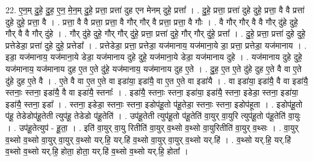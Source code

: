\documentclass[17pt]{extarticle}
\begin{document}
22. ए॒न॒म् दु॒हे॒ दु॒ह॒ ए॒न॒ मे॒न॒म् दु॒हे॒ प्रत्ता॒ प्रत्ता॑ दुह एन मेनम् दुहे॒ प्रत्ता᳚ । . दु॒हे॒ प्रत्ता॒ प्रत्ता॑ दुहे दुहे॒ प्रत्ता॒ वै वै प्रत्ता॑ दुहे दुहे॒ प्रत्ता॒ वै । . प्रत्ता॒ वै वै प्रत्ता॒ प्रत्ता॒ वै गौर् गौर् वै प्रत्ता॒ प्रत्ता॒ वै गौः । . वै गौर् गौर् वै वै गौर् दु॑हे दुहे॒ गौर् वै वै गौर् दु॑हे । . गौर् दु॑हे दुहे॒ गौर् गौर् दु॑हे॒ प्रत्ता॒ प्रत्ता॑ दुहे॒ गौर् गौर् दु॑हे॒ प्रत्ता᳚ । . दु॒हे॒ प्रत्ता॒ प्रत्ता॑ दुहे दुहे॒ प्रत्तेडेडा॒ प्रत्ता॑ दुहे दुहे॒ प्रत्तेडा᳚ । . प्रत्तेडेडा॒ प्रत्ता॒ प्रत्तेडा॒ यज॑मानाय॒ यज॑माना॒ये डा॒ प्रत्ता॒ प्रत्तेडा॒ यज॑मानाय । . इडा॒ यज॑मानाय॒ यज॑माना॒ये डेडा॒ यज॑मानाय दुहे दुहे॒ यज॑माना॒ये डेडा॒ यज॑मानाय दुहे । . यज॑मानाय दुहे दुहे॒ यज॑मानाय॒ यज॑मानाय दुह ए॒त ए॒ते दु॑हे॒ यज॑मानाय॒ यज॑मानाय दुह ए॒ते । . दु॒ह॒ ए॒त ए॒ते दु॑हे दुह ए॒ते वै वा ए॒ते दु॑हे दुह ए॒ते वै । . ए॒ते वै वा ए॒त ए॒ते वा इडा॑या॒ इडा॑यै॒ वा ए॒त ए॒ते वा इडा॑यै । . वा इडा॑या॒ इडा॑यै॒ वै वा इडा॑यै॒ स्तनाः॒ स्तना॒ इडा॑यै॒ वै वा इडा॑यै॒ स्तनाः᳚ । . इडा॑यै॒ स्तनाः॒ स्तना॒ इडा॑या॒ इडा॑यै॒ स्तना॒ इडेडा॒ स्तना॒ इडा॑या॒ इडा॑यै॒ स्तना॒ इडा᳚ । . स्तना॒ इडेडा॒ स्तनाः॒ स्तना॒ इडोप॑हू॒तो प॑हू॒तेडा॒ स्तनाः॒ स्तना॒ इडोप॑हूता । . इडोप॑हू॒तो प॑हू॒ तेडेडोप॑हू॒तेती त्युप॑हू॒ तेडेडो प॑हू॒तेति॑ । . उप॑हू॒तेती त्युप॑हू॒तो प॑हू॒तेति॑ वा॒युर् वा॒युरि त्युप॑हू॒तो प॑हू॒तेति॑ वा॒युः । . उप॑हू॒तेत्युप॑ - हू॒ता॒ । . इति॑ वा॒युर् वा॒यु रितीति॑ वा॒युर् व॒थ्सो व॒थ्सो वा॒युरितीति॑ वा॒युर् व॒थ्सः । . वा॒युर् व॒थ्सो व॒थ्सो वा॒युर् वा॒युर् व॒थ्सो यर्.हि॒ यर्.हि॑ व॒थ्सो वा॒युर् वा॒युर् व॒थ्सो यर्.हि॑ । . व॒थ्सो यर्.हि॒ यर्.हि॑ व॒थ्सो व॒थ्सो यर्.हि॒ होता॒ होता॒ यर्.हि॑ व॒थ्सो व॒थ्सो यर्.हि॒ होता᳚ । \newline
\end{document}

